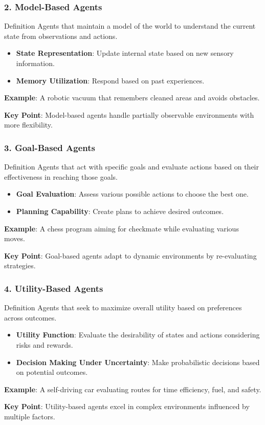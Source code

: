 \documentclass[aspectratio=169]{beamer}
\begin{document}
\begin{frame}[fragile]
    \frametitle{2. Model-Based Agents}
    \begin{block}{Definition}
        Agents that maintain a model of the world to understand the current state from observations and actions.
    \end{block}
    \begin{itemize}
        \item \textbf{State Representation}: Update internal state based on new sensory information.
        \item \textbf{Memory Utilization}: Respond based on past experiences.
    \end{itemize}
    \textbf{Example}: A robotic vacuum that remembers cleaned areas and avoids obstacles.
    
    \textbf{Key Point}: Model-based agents handle partially observable environments with more flexibility.
\end{frame}

\begin{frame}[fragile]
    \frametitle{3. Goal-Based Agents}
    \begin{block}{Definition}
        Agents that act with specific goals and evaluate actions based on their effectiveness in reaching those goals.
    \end{block}
    \begin{itemize}
        \item \textbf{Goal Evaluation}: Assess various possible actions to choose the best one.
        \item \textbf{Planning Capability}: Create plans to achieve desired outcomes.
    \end{itemize}
    \textbf{Example}: A chess program aiming for checkmate while evaluating various moves.
    
    \textbf{Key Point}: Goal-based agents adapt to dynamic environments by re-evaluating strategies.
\end{frame}

\begin{frame}[fragile]
    \frametitle{4. Utility-Based Agents}
    \begin{block}{Definition}
        Agents that seek to maximize overall utility based on preferences across outcomes.
    \end{block}
    \begin{itemize}
        \item \textbf{Utility Function}: Evaluate the desirability of states and actions considering risks and rewards.
        \item \textbf{Decision Making Under Uncertainty}: Make probabilistic decisions based on potential outcomes.
    \end{itemize}
    \textbf{Example}: A self-driving car evaluating routes for time efficiency, fuel, and safety.
    
    \textbf{Key Point}: Utility-based agents excel in complex environments influenced by multiple factors.
\end{frame}
\end{document}
